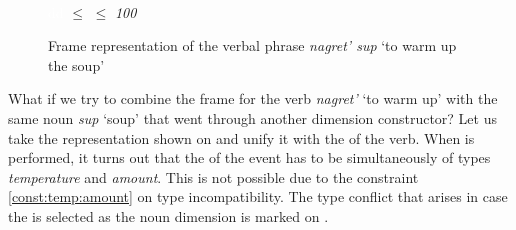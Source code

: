 \begin{figure}
\centering
{}\\
\textcolor{white}{dd}  $\leq$  $\leq$ \textit{100}
\caption{Frame representation of the verbal phrase \textit{nagret' sup} `to warm up the soup' \label{frame:nagret:soup}}
\end{figure}

What if we try to combine the frame for the verb \textit{nagret'} `to warm up' with the same noun \textit{sup} `soup' that went through another dimension constructor? Let us take the representation shown on  and unify it with the  of the verb. When  is performed, it turns out that the  of the event has to be simultaneously of types \textit{temperature} and \textit{amount}. This is not possible due to the constraint \ref{const:temp:amount} on type incompatibility. The type conflict that arises in case the  is selected as the noun dimension is marked on . 

